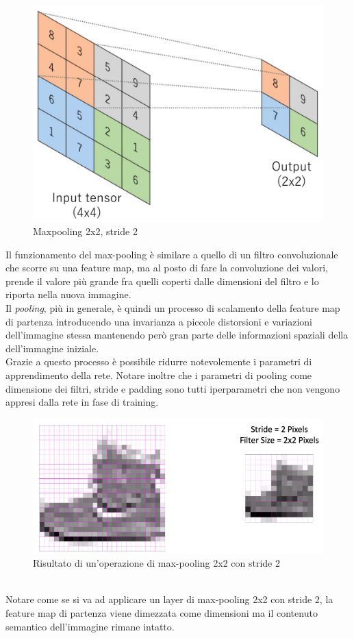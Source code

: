 \documentclass[12pt,a4paper,openright,twoside]{report}
\begin{document}
\begin{figure}[h]
\centering
\includegraphics[width=\linewidth]{maxpooling.png}
\caption{Maxpooling 2x2, stride 2}
\end{figure}
Il funzionamento del max-pooling è similare a quello di un filtro convoluzionale che scorre su una feature map, ma al posto di fare la convoluzione dei valori, prende il valore più grande fra quelli coperti dalle dimensioni del filtro e lo riporta nella nuova immagine.\\

Il \emph{pooling}, più in generale, è quindi un processo di scalamento della feature map di partenza introducendo una invarianza a piccole distorsioni e variazioni dell'immagine stessa mantenendo però gran parte delle informazioni spaziali della dell'immagine iniziale.\\
Grazie a questo processo è possibile ridurre notevolemente i parametri di apprendimento della rete. Notare inoltre che i parametri di pooling come dimensione dei filtri, stride e padding sono tutti iperparametri che non vengono appresi dalla rete in fase di training.
\begin{figure}[h]
\centering
\includegraphics[width=\linewidth]{maxPoolingResult.png}
\caption{Risultato di un'operazione di max-pooling 2x2 con stride 2}
\end{figure}
\\Notare come se si va ad applicare un layer di max-pooling 2x2 con stride 2, la feature map di partenza viene dimezzata come dimensioni ma il contenuto semantico dell'immagine rimane intatto.
\end{document}
